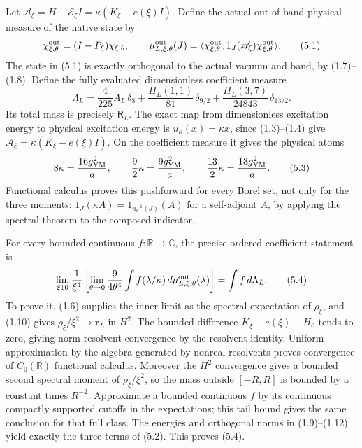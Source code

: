 \documentclass[
  11pt,
]{article}
\begin{document}
Let \(\mathscr A_\xi=H-\mathcal E_\xi I
=\kappa(K_\xi-e(\xi)I)\). Define the actual out-of-band physical measure
of the native state by \[
 \chi^{\rm out}_{\xi,\theta}=(I-P_\xi)\chi_{\xi,\theta},
 \qquad
 \mu^{\rm out}_{L,\xi,\theta}(J)
 =\langle\chi^{\rm out}_{\xi,\theta},
                 1_J(\mathscr A_\xi)\chi^{\rm out}_{\xi,\theta}\rangle.
\tag{5.1}
\] The state in (5.1) is exactly orthogonal to the actual vacuum and
band, by (1.7)--(1.8). Define the fully evaluated dimensionless
coefficient measure \[
 \Lambda_L=\frac4{225}A_L\,\delta_8
       +\frac{H_L(1,1)}{81}\,\delta_{9/2}
       +\frac{H_L(3,7)}{24843}\,\delta_{13/2}.
\tag{5.2}
\] Its total mass is precisely \(\mathsf R_L\). The exact map from
dimensionless excitation energy to physical excitation energy is
\(u_\kappa(x)=\kappa x\), since (1.3)--(1.4) give
\(\mathscr A_\xi=\kappa(K_\xi-e(\xi)I)\). On the coefficient measure it
gives the physical atoms \[
 8\kappa=\frac{16g_{\rm YM}^2}{a},\qquad
 \frac92\kappa=\frac{9g_{\rm YM}^2}{a},\qquad
 \frac{13}2\kappa=\frac{13g_{\rm YM}^2}{a}.
\tag{5.3}
\] Functional calculus proves this pushforward for every Borel set, not
only for the three moments: \(1_J(\kappa A)=1_{u_\kappa^{-1}(J)}(A)\)
for a self-adjoint \(A\), by applying the spectral theorem to the
composed indicator.

For every bounded continuous \(f:\mathbb R\to\mathbb C\), the precise
ordered coefficient statement is \[
 \lim_{\xi\downarrow0}\frac1{\xi^4}
 \left[\lim_{\theta\to0}\frac9{4\theta^4}
       \int f(\lambda/\kappa)\,d\mu^{\rm out}_{L,\xi,\theta}(\lambda)
 \right]=\int f\,d\Lambda_L.
\tag{5.4}
\] To prove it, (1.6) supplies the inner limit as the spectral
expectation of \(\rho_\xi\), and (1.10) gives
\(\rho_\xi/\xi^2\to\mathbf r_L\) in \(H^2\). The bounded difference
\(K_\xi-e(\xi)-H_0\) tends to zero, giving norm-resolvent convergence by
the resolvent identity. Uniform approximation by the algebra generated
by nonreal resolvents proves convergence of \(C_0(\mathbb R)\)
functional calculus. Moreover the \(H^2\) convergence gives a bounded
second spectral moment of \(\rho_\xi/\xi^2\), so the mass outside
\([-R,R]\) is bounded by a constant times \(R^{-2}\). Approximate a
bounded continuous \(f\) by its continuous compactly supported cutoffs
in the expectations; this tail bound gives the same conclusion for that
full class. The energies and orthogonal norms in (1.9)--(1.12) yield
exactly the three terms of (5.2). This proves (5.4).
\end{document}
